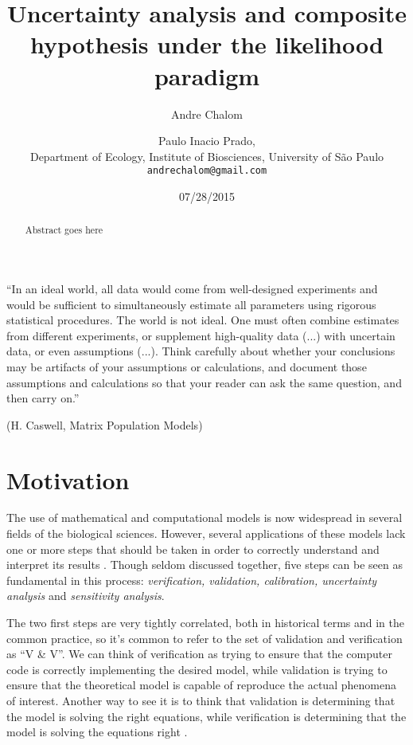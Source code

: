 \documentclass[twoside,12pt,a4paper]{article}
\begin{document}

\title{Uncertainty analysis and composite hypothesis under the likelihood paradigm}
\author{Andre Chalom \and Paulo Inacio Prado,\\ 
  Department of Ecology, Institute of Biosciences, University of São Paulo \\
  \texttt{andrechalom@gmail.com}
  }
\date{07/28/2015}
\maketitle

\begin{abstract}
  Abstract goes here
\end{abstract}

\newpage
\vfill
\noindent
``In an ideal world, all data would come from well-designed experiments
and would be sufficient to simultaneously estimate all parameters using rigorous
statistical procedures. The world is not ideal. One must often combine estimates
from different experiments, or supplement high-quality data (...) with uncertain
data, or even assumptions (...). Think carefully about whether your conclusions
may be artifacts of your assumptions or calculations, and document those assumptions
and calculations so that your reader can ask the same question, and then carry on.''
\begin{flushright}
(H. Caswell, Matrix Population Models)
\end{flushright}
\vfill
\indent
\newpage
\tableofcontents
\newpage

\section{Motivation}

The use of mathematical and computational models is now widespread in several fields of the biological 
sciences. However, several applications of these models lack one or more steps that should be taken in
order to correctly understand and interpret its results \citep{Bart95}. Though seldom discussed together,
five steps can be seen as fundamental in this process: {\em verification, validation, calibration, 
uncertainty analysis} and {\em sensitivity analysis}. 

The two first steps are very tightly correlated, both in historical terms and in the common practice,
so it's common to refer to the set of validation and verification as ``V \& V''. We can think of verification
as trying to ensure that the computer code is correctly implementing the desired model, while validation
is trying to ensure that the theoretical model is capable of reproduce the actual phenomena of interest.
Another way to see it is to think that validation is determining that the model is solving the right 
equations, while verification is determining that the model is solving the equations right \citep{ASC2010}.
\end{document}
